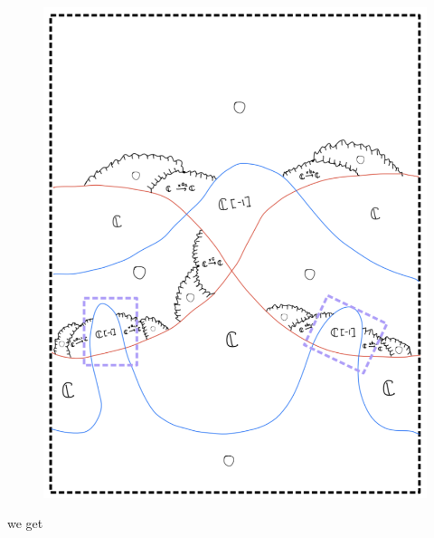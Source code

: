 \begin{enumerate}[label = (\roman*)]
\begin{enumerate}[label = (Step \arabic*)]
\begin{figure}[H]
    \includegraphics[scale = 0.95]{diagrams/cobord_gen/base_2.png}
    \caption{}
    \label{fig:your-label}
\end{figure}
we get
\begin{figure}[H]
    \centering

\end{figure}
\end{enumerate}
\end{enumerate}
